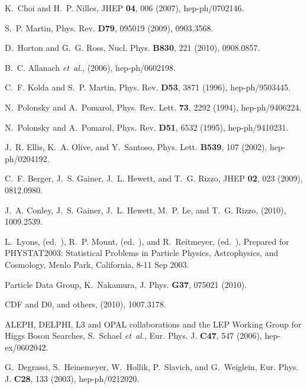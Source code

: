 \begin{thebibliography}{10}

K.~Choi and H.~P. Nilles,
\newblock JHEP {\bf 04}, 006 (2007), hep-ph/0702146.

S.~P. Martin,
\newblock Phys. Rev. {\bf D79}, 095019 (2009), 0903.3568.

D.~Horton and G.~G. Ross,
\newblock Nucl. Phys. {\bf B830}, 221 (2010), 0908.0857.

B.~C. Allanach {\em et~al.},
\newblock (2006), hep-ph/0602198.

C.~F. Kolda and S.~P. Martin,
\newblock Phys. Rev. {\bf D53}, 3871 (1996), hep-ph/9503445.

N.~Polonsky and A.~Pomarol,
\newblock Phys. Rev. Lett. {\bf 73}, 2292 (1994), hep-ph/9406224.

N.~Polonsky and A.~Pomarol,
\newblock Phys. Rev. {\bf D51}, 6532 (1995), hep-ph/9410231.

J.~R. Ellis, K.~A. Olive, and Y.~Santoso,
\newblock Phys. Lett. {\bf B539}, 107 (2002), hep-ph/0204192.

C.~F. Berger, J.~S. Gainer, J.~L. Hewett, and T.~G. Rizzo,
\newblock JHEP {\bf 02}, 023 (2009), 0812.0980.

J.~A. Conley, J.~S. Gainer, J.~L. Hewett, M.~P. Le, and T.~G. Rizzo,
\newblock (2010), 1009.2539.

L.~Lyons, (ed.~), R.~P. Mount, (ed.~), and R.~Reitmeyer, (ed.~),
\newblock Prepared for PHYSTAT2003: Statistical Problems in Particle Physics,
  Astrophysics, and Cosmology, Menlo Park, California, 8-11 Sep 2003.

Particle Data Group, K.~Nakamura,
\newblock J. Phys. {\bf G37}, 075021 (2010).

CDF and D0, and others,
\newblock (2010), 1007.3178.

{ALEPH, DELPHI, L3 and OPAL collaborations and the LEP Working Group for Higgs
  Boson Searches}, S.~Schael {\em et~al.},
\newblock Eur. Phys. J. {\bf C47}, 547 (2006), hep-ex/0602042.

G.~Degrassi, S.~Heinemeyer, W.~Hollik, P.~Slavich, and G.~Weiglein,
\newblock Eur. Phys. J. {\bf C28}, 133 (2003), hep-ph/0212020.


\end{thebibliography}
